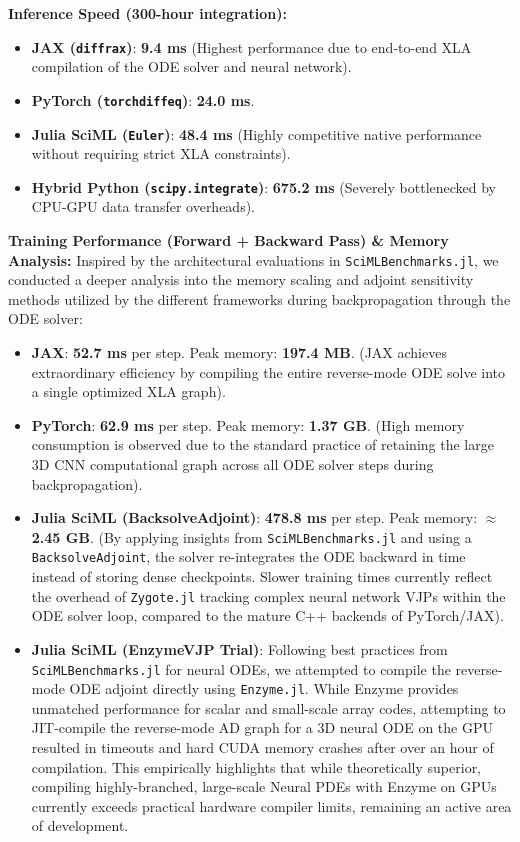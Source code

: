 \documentclass[10pt,letterpaper]{article}
\begin{document}
\textbf{Inference Speed (300-hour integration):}
\begin{itemize}
    \item \textbf{JAX (\texttt{diffrax})}: \textbf{9.4 ms} (Highest performance due to end-to-end XLA compilation of the ODE solver and neural network).
    \item \textbf{PyTorch (\texttt{torchdiffeq})}: \textbf{24.0 ms}.
    \item \textbf{Julia SciML (\texttt{Euler})}: \textbf{48.4 ms} (Highly competitive native performance without requiring strict XLA constraints).
    \item \textbf{Hybrid Python (\texttt{scipy.integrate})}: \textbf{675.2 ms} (Severely bottlenecked by CPU-GPU data transfer overheads).
\end{itemize}

\textbf{Training Performance (Forward + Backward Pass) \& Memory Analysis:}
Inspired by the architectural evaluations in \texttt{SciMLBenchmarks.jl}, we conducted a deeper analysis into the memory scaling and adjoint sensitivity methods utilized by the different frameworks during backpropagation through the ODE solver:
\begin{itemize}
    \item \textbf{JAX}: \textbf{52.7 ms} per step. Peak memory: \textbf{197.4 MB}. (JAX achieves extraordinary efficiency by compiling the entire reverse-mode ODE solve into a single optimized XLA graph).
    \item \textbf{PyTorch}: \textbf{62.9 ms} per step. Peak memory: \textbf{1.37 GB}. (High memory consumption is observed due to the standard practice of retaining the large 3D CNN computational graph across all ODE solver steps during backpropagation).
    \item \textbf{Julia SciML (BacksolveAdjoint)}: \textbf{478.8 ms} per step. Peak memory: \textbf{$\approx$ 2.45 GB}. (By applying insights from \texttt{SciMLBenchmarks.jl} and using a \texttt{BacksolveAdjoint}, the solver re-integrates the ODE backward in time instead of storing dense checkpoints. Slower training times currently reflect the overhead of \texttt{Zygote.jl} tracking complex neural network VJPs within the ODE solver loop, compared to the mature C++ backends of PyTorch/JAX).
    \item \textbf{Julia SciML (EnzymeVJP Trial)}: Following best practices from \texttt{SciMLBenchmarks.jl} for neural ODEs, we attempted to compile the reverse-mode ODE adjoint directly using \texttt{Enzyme.jl}. While Enzyme provides unmatched performance for scalar and small-scale array codes, attempting to JIT-compile the reverse-mode AD graph for a 3D neural ODE on the GPU resulted in timeouts and hard CUDA memory crashes after over an hour of compilation. This empirically highlights that while theoretically superior, compiling highly-branched, large-scale Neural PDEs with Enzyme on GPUs currently exceeds practical hardware compiler limits, remaining an active area of development.
\end{itemize}
\end{document}
